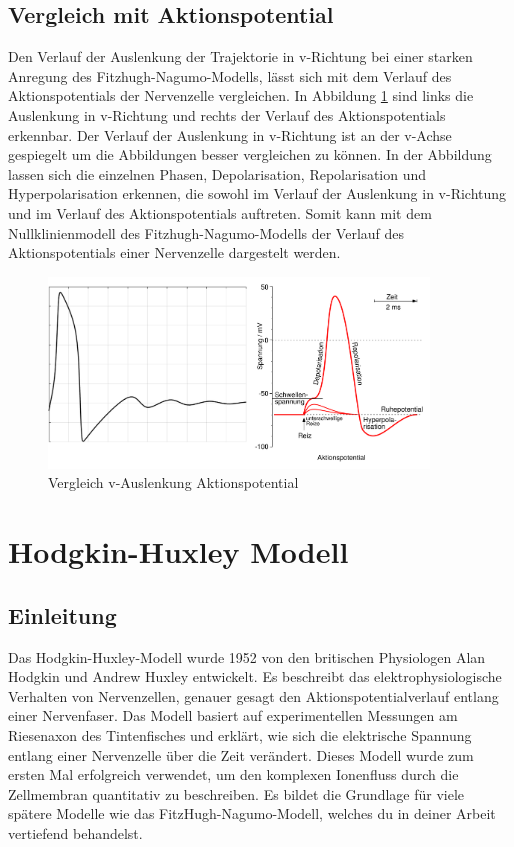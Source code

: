 \begin{refsection}
\subsection{Vergleich mit Aktionspotential}
Den Verlauf der Auslenkung der Trajektorie in v-Richtung bei einer starken Anregung des Fitzhugh-Nagumo-Modells, lässt
sich mit dem Verlauf des Aktionspotentials der Nervenzelle vergleichen. 
In Abbildung \ref{fig:Vergleich} sind links die Auslenkung in v-Richtung und rechts der Verlauf des Aktionspotentials
erkennbar.
Der Verlauf der Auslenkung in v-Richtung ist an der v-Achse gespiegelt um die Abbildungen besser vergleichen zu können.
In der Abbildung lassen sich die einzelnen Phasen, Depolarisation, Repolarisation und Hyperpolarisation erkennen, die
sowohl im Verlauf der Auslenkung in v-Richtung und im Verlauf des Aktionspotentials auftreten.
Somit kann mit dem Nullklinienmodell des Fitzhugh-Nagumo-Modells der Verlauf des Aktionspotentials einer Nervenzelle
dargestelt werden.
\begin{figure}[H]
    \centering
    \includegraphics[width=0.9\textwidth]{papers/nerven/Bilder/Vergleich.png}
    \caption{Vergleich v-Auslenkung Aktionspotential}
    \label{fig:Vergleich}
\end{figure}
\section{Hodgkin-Huxley Modell}
\subsection{Einleitung}
Das Hodgkin-Huxley-Modell wurde 1952 von den britischen Physiologen Alan Hodgkin und Andrew Huxley entwickelt. Es beschreibt das elektrophysiologische Verhalten von Nervenzellen, genauer gesagt den Aktionspotentialverlauf entlang einer Nervenfaser. Das Modell basiert auf experimentellen Messungen am Riesenaxon des Tintenfisches und erklärt, wie sich die elektrische Spannung entlang einer Nervenzelle über die Zeit verändert. Dieses Modell wurde zum ersten Mal erfolgreich verwendet, um den komplexen Ionenfluss durch die Zellmembran quantitativ zu beschreiben. Es bildet die Grundlage für viele spätere Modelle wie das FitzHugh-Nagumo-Modell, welches du in deiner Arbeit vertiefend behandelst.

\end{refsection}
